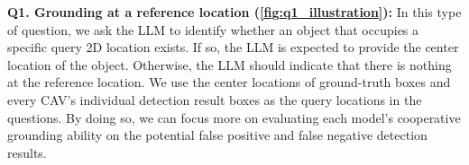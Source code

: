   
\noindent\textbf{Q1. Grounding at a reference location (\cref{fig:q1_illustration}):}
In this type of question, we ask the LLM to identify whether an object that occupies a specific query 2D location exists. 
If so, the LLM is expected to provide the center location of the object. Otherwise, the LLM should indicate that there is nothing at the reference location. 
We use the center locations of ground-truth boxes and every CAV's individual detection result boxes as the query locations in the questions. By doing so, we can focus more on evaluating each model's cooperative grounding ability on the potential false positive and false negative detection results.


